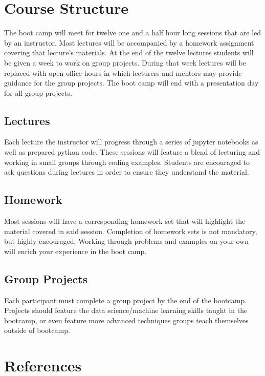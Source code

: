 \documentclass[12pt]{article}
\begin{document}
\section*{Course Structure}

The boot camp will meet for twelve one and a half hour long sessions that are led
by an instructor. Most lectures will be accompanied by a homework assignment covering that
lecture's materials. At the end of the twelve lectures students will be given a week to
work on group projects. During that week lectures will be replaced with open office
hours in which lecturers and mentors may provide guidance for the group projects.
The boot camp will end with a presentation day for all group projects.

\subsection*{Lectures}
Each lecture the instructor will progress through a series of jupyter
notebooks as well as prepared python code. These sessions will feature a blend
of lecturing and working in small groups through coding examples. Students are
encouraged to ask questions during lectures in order to ensure they understand the
material.

\subsection*{Homework}
Most sessions will have a corresponding homework set that will highlight the material
covered in said session. Completion of homework sets is not mandatory, but highly encouraged. Working through problems and examples on your own will enrich your experience in the boot camp.

\subsection*{Group Projects}
Each participant must complete a group project by the end of the bootcamp. Projects
should feature the data science/machine learning skills taught in the bootcamp, or
even feature more advanced techniques groups teach themselves outside of bootcamp.

\section*{References}
\end{document}
